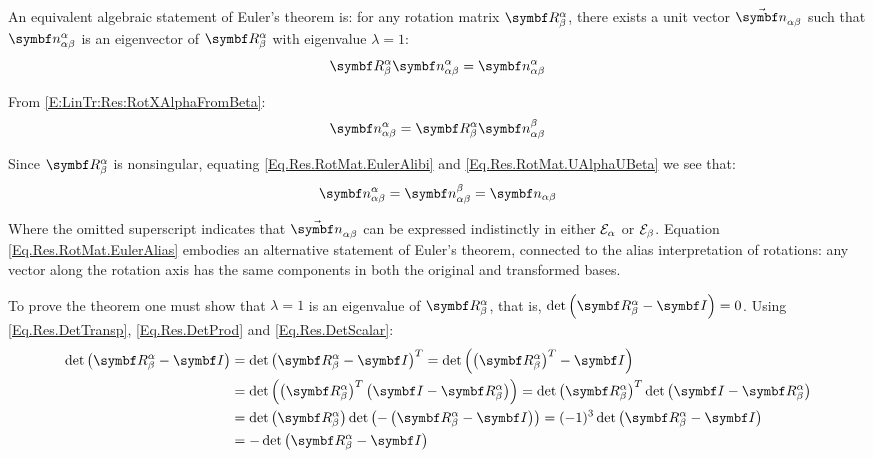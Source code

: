 An equivalent algebraic statement of Euler's theorem is: for any rotation matrix $\RotM{\alpha}{\beta}$, there exists a unit vector $\varel{\rotax}{\alpha}{\beta}$ such that $\vrelprj{\rotax}{\alpha}{\beta}{\alpha}$ is an eigenvector of $\RotM{\alpha}{\beta}$ with eigenvalue $\lambda=1$:
\begin{equation}\label{Eq.Res.RotMat.EulerAlibi}
\RotM{\alpha}{\beta} \vrelprj{\rotax}{\alpha}{\beta}{\alpha} = \vrelprj{\rotax}{\alpha}{\beta}{\alpha}
\end{equation}

From \eqref{E:LinTr:Res:RotXAlphaFromBeta}:
\begin{equation}\label{Eq.Res.RotMat.UAlphaUBeta}
\vrelprj{\rotax}{\alpha}{\beta}{\alpha} = \RotM{\alpha}{\beta} \vrelprj{\rotax}{\alpha}{\beta}{\beta}
\end{equation}

Since $\RotM{\alpha}{\beta}$ is nonsingular, equating \eqref{Eq.Res.RotMat.EulerAlibi} and \eqref{Eq.Res.RotMat.UAlphaUBeta} we see that:
\begin{equation}\label{Eq.Res.RotMat.EulerAlias}
\vrelprj{\rotax}{\alpha}{\beta}{\alpha} = \vrelprj{\rotax}{\alpha}{\beta}{\beta} = \vrel{\rotax}{\alpha}{\beta}
\end{equation}

Where the omitted superscript indicates that $\varel{\rotax}{\alpha}{\beta}$ can be expressed indistinctly in either $\basis[\alpha]$ or $\basis[\beta]$. Equation \eqref{Eq.Res.RotMat.EulerAlias} embodies an alternative statement of Euler's theorem, connected to the alias interpretation of rotations: any vector along the rotation axis has the same components in both the original and transformed bases.

To prove the theorem one must show that $\lambda=1$ is an eigenvalue of $\RotM{\alpha}{\beta}$, that is, $\det \rndp{\RotM{\alpha}{\beta}-\IdM}=0$. Using \eqref{Eq.Res.DetTransp}, \eqref{Eq.Res.DetProd} and \eqref{Eq.Res.DetScalar}:
\begin{equation*}
\begin{split}
\det \rndp{\RotM{\alpha}{\beta}-\IdM} &= \det \trp{\RotM{\alpha}{\beta}-\IdM} = \det \rndp{\trp{\RotM{\alpha}{\beta}}-\IdM} \\
						&= \det \rndp{\trp{\RotM{\alpha}{\beta}} \rndp{\IdM - \RotM{\alpha}{\beta}}} = \det \trp{\RotM{\alpha}{\beta}} \det \rndp{\IdM - \RotM{\alpha}{\beta}} \\
						&= \det \rndp{\RotM{\alpha}{\beta}} \det \rndp{-\rndp{\RotM{\alpha}{\beta}-\IdM}} = (-1)^{3} \det \rndp{\RotM{\alpha}{\beta}-\IdM} \\
						&= -\det \rndp{\RotM{\alpha}{\beta}-\IdM} 
\end{split}
\end{equation*}

